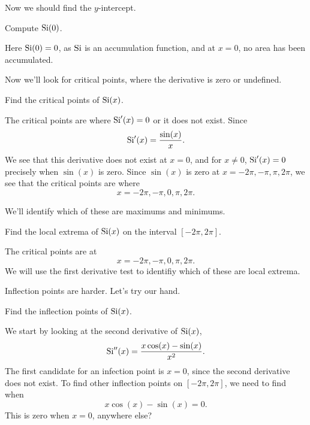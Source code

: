 \documentclass{ximera}
\begin{document}
Now we should find the $y$-intercept.

\begin{example}
  Compute $\operatorname{Si}(0)$.
  \begin{explanation}
    Here $\operatorname{Si}(0)=0$, as $\operatorname{Si}$ is an accumulation
    function, and at $x=0$, no area has been accumulated.
  \end{explanation}
\end{example}



Now we'll look for critical points, where the derivative is zero or
undefined.

\begin{example}
  Find the critical points of $\operatorname{Si}(x)$.
  \begin{explanation}
    The critical points are where $\operatorname{Si}'(x)= 0$ or it does not exist.
    Since
    \[
    \operatorname{Si}'(x) = \frac{\sin(x)}{x}.
    \]
    We see that this derivative does not exist at $x=0$, and for $x\ne
    0$, $\operatorname{Si}'(x)=0$ precisely when $\sin(x)$ is zero. Since $\sin(x)$
    is zero at $x = -2\pi, -\pi, \pi, 2\pi$, we see that the critical
    points are where
    \[
    x= -2\pi, -\pi,0, \pi, 2\pi.
    \]
  \end{explanation}
\end{example}

We'll identify which of these are maximums and minimums.

\begin{example}
  Find the local extrema of $\operatorname{Si}(x)$ on the interval $[-2\pi,2\pi]$.
  \begin{explanation}
    The critical points are at
    \[
    x= -2\pi, -\pi,0, \pi, 2\pi.
    \]
    We will use the first derivative test to identifiy which of these
    are local extrema.
    
  \end{explanation}
\end{example}

Inflection points are harder. Let's try our hand.

\begin{example}
  Find the inflection points of $\operatorname{Si}(x)$.
  \begin{explanation}
    We start by looking at the second derivative of $\operatorname{Si}(x)$,
    \[
    \operatorname{Si}''(x) = \frac{x\cos(x) -\sin(x)}{x^2}.
    \]
    The first candidate for an infection point is $x=0$, since the
    second derivative does not exist. To find other inflection points
    on $[-2\pi,2\pi]$, we need to find when
    \[
    x\cos(x) -\sin(x) =0.
    \]
    This is zero when $x=0$, anywhere else?
  \end{explanation}
\end{example}
\end{document}
